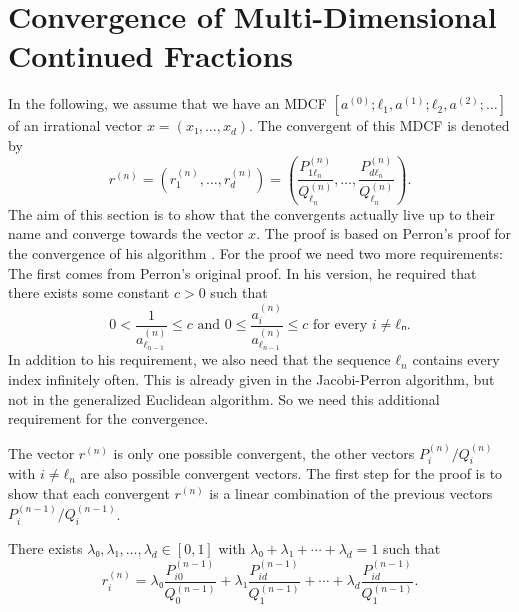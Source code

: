 \section{Convergence of Multi-Dimensional Continued Fractions}

In the following, we assume that we have an MDCF $[a^{(0)}; ℓ_1, a^{(1)}; ℓ_2, a^{(2)}; …]$
of an irrational vector $x = (x₁, …, x_d)$.
The convergent of this MDCF is denoted by
\[
  r^{(n)}
  = (r_1^{(n)}, …, r_d^{(n)})
  = \left( \frac{P_{1ℓ_n}^{(n)}}{Q_{ℓ_n}^{(n)}}, \dots, \frac{P_{dℓ_n}^{(n)}}{Q_{ℓ_n}^{(n)}} \right).
\]
The aim of this section is to show that the convergents actually live up to
their name and converge towards the vector $x$.
The proof is based on Perron's proof for the convergence of his
algorithm \cite{Perron07}.
For the proof we need two more requirements:
The first comes from Perron's original proof.
In his version, he required that there exists some constant $c > 0$ such that
\[
  0 < \frac{1}{a_{ℓ_{n-1}}^{(n)}} ≤ c \text{ and } 0 ≤ \frac{a_i^{(n)}}{a_{ℓ_{n-1}}^{(n)}} ≤ c \text{ for every } i ≠ ℓₙ.
\]
In addition to his requirement, we also need that the sequence $ℓ_n$
contains every index infinitely often.
This is already given in the Jacobi-Perron algorithm,
but not in the generalized Euclidean algorithm.
So we need this additional requirement for the convergence.

The vector $r^{(n)}$ is only one possible convergent,
the other vectors $P_i^{(n)}/Q_i^{(n)}$ with $i ≠ ℓ_n$ are also possible convergent vectors.
The first step for the proof is to show that each convergent $r^{(n)}$ is a
linear combination of the previous vectors $P_i^{(n-1)}/Q_i^{(n-1)}$.

\begin{lemma}
  \label{lem:conv-conv}
  There exists $λ₀, λ₁, …, λ_d ∈ [0, 1]$ with $λ₀ + λ₁ + ⋯ + λ_d = 1$ such that
  \[
    r_i^{(n)} = λ₀ \frac{P_{i0}^{(n-1)}}{Q_0^{(n-1)}} + λ₁ \frac{P_{id}^{(n-1)}}{Q_1^{(n-1)}} + ⋯ + λ_d \frac{P_{id}^{(n-1)}}{Q_1^{(n-1)}}.
  \]
\end{lemma}

